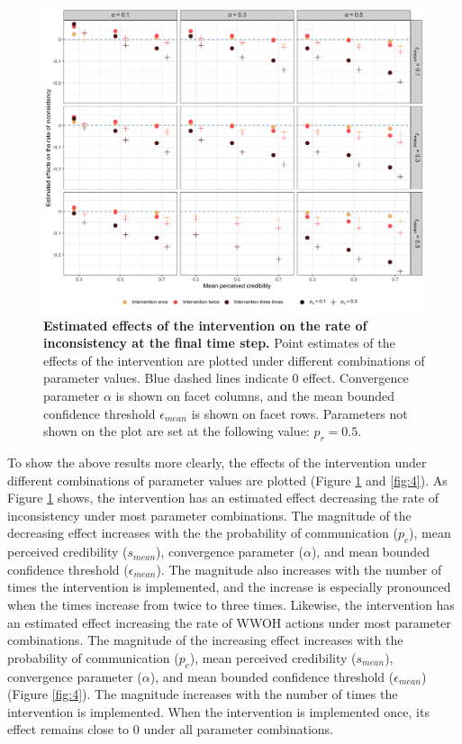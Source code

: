 \documentclass[
  11pt,
]{article}
\begin{document}
\begin{figure}[h]
  \centering
  \includegraphics[width=1\columnwidth]{./figures/intervention_effect_p_inconsistency.png}
  \caption{\textbf{Estimated effects of the intervention on the rate of inconsistency at the final time step.} Point estimates of the effects of the intervention are plotted under different combinations of parameter values. Blue dashed lines indicate 0 effect. Convergence parameter $\alpha$ is shown on facet columns, and the mean bounded confidence threshold $\epsilon_{mean}$ is shown on facet rows. Parameters not shown on the plot are set at the following value: $p_r = 0.5$.}
  \label{fig:3}
\end{figure}

To show the above results more clearly, the effects of the intervention
under different combinations of parameter values are plotted (Figure
\ref{fig:3} and \ref{fig:4}). As Figure \ref{fig:3} shows, the
intervention has an estimated effect decreasing the rate of
inconsistency under most parameter combinations. The magnitude of the
decreasing effect increases with the the probability of communication
(\(p_c\)), mean perceived credibility (\(s_{mean}\)), convergence
parameter (\(\alpha\)), and mean bounded confidence threshold
(\(\epsilon_{mean}\)). The magnitude also increases with the number of
times the intervention is implemented, and the increase is especially
pronounced when the times increase from twice to three times. Likewise,
the intervention has an estimated effect increasing the rate of WWOH
actions under most parameter combinations. The magnitude of the
increasing effect increases with the probability of communication
(\(p_c\)), mean perceived credibility (\(s_{mean}\)), convergence
parameter (\(\alpha\)), and mean bounded confidence threshold
(\(\epsilon_{mean}\)) (Figure \ref{fig:4}). The magnitude increases with
the number of times the intervention is implemented. When the
intervention is implemented once, its effect remains close to 0 under
all parameter combinations.
\end{document}
